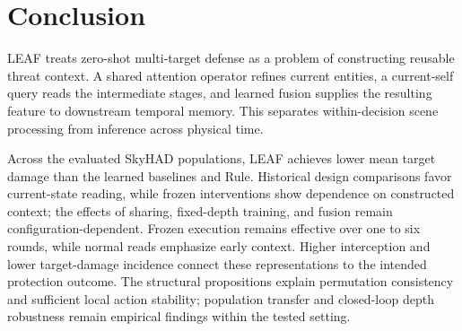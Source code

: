 \section{Conclusion}
LEAF treats zero-shot multi-target defense as a problem of constructing reusable threat context. A shared attention operator refines current entities, a current-self query reads the intermediate stages, and learned fusion supplies the resulting feature to downstream temporal memory. This separates within-decision scene processing from inference across physical time.

Across the evaluated SkyHAD populations, LEAF achieves lower mean target damage than the learned baselines and Rule. Historical design comparisons favor current-state reading, while frozen interventions show dependence on constructed context; the effects of sharing, fixed-depth training, and fusion remain configuration-dependent. Frozen execution remains effective over one to six rounds, while normal reads emphasize early context. Higher interception and lower target-damage incidence connect these representations to the intended protection outcome. The structural propositions explain permutation consistency and sufficient local action stability; population transfer and closed-loop depth robustness remain empirical findings within the tested setting.
